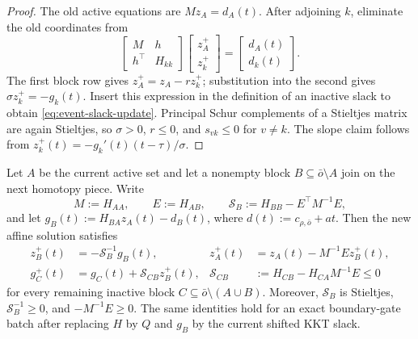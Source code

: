 \begin{proof}
The old active equations are $Mz_A=d_A(t)$.  After adjoining $k$, eliminate
the old coordinates from
\begin{equation*}
 \begin{bmatrix}M&h\\h^\top&H_{kk}\end{bmatrix}
 \begin{bmatrix}z_A^+\\z_k^+\end{bmatrix}
 =\begin{bmatrix}d_A(t)\\d_k(t)\end{bmatrix}.
\end{equation*}
The first block row gives $z_A^+=z_A-rz_k^+$; substitution into the second
gives $\sigma z_k^+=-g_k(t)$.  Insert this expression in the definition of
an inactive slack to obtain \cref{eq:event-slack-update}.  Principal Schur
complements of a Stieltjes matrix are again Stieltjes, so
$\sigma>0$, $r\leq0$, and $s_{vk}\leq0$ for $v\ne k$.  The slope claim
follows from $z_k^+(t)=-g_k'(t)(t-\tau)/\sigma$.
\end{proof}

\begin{lemma}
\label{lem:block-event-schur-update}
Let $A$ be the current active set and let a nonempty block
$B\subseteq\bar o\setminus A$ join on the next homotopy piece.  Write
\begin{equation}
 M:=H_{AA},
 \qquad E:=H_{AB},
 \qquad
 \mathcal S_B:=H_{BB}-E^\top M^{-1}E,
 \label{eq:block-event-schur-data}
\end{equation}
and let
$g_B(t):=H_{BA}z_A(t)-d_B(t)$, where
$d(t):=c_{\rho,\bar o}+at$.  Then the new affine solution satisfies
\begin{align}
 z_B^+(t)&=-\mathcal S_B^{-1}g_B(t),
 &z_A^+(t)&=z_A(t)-M^{-1}Ez_B^+(t),
 \label{eq:block-event-primal-update}\\
 g_C^+(t)&=g_C(t)+\mathcal S_{CB}z_B^+(t),
 &\mathcal S_{CB}&:=H_{CB}-H_{CA}M^{-1}E\leq0
 \label{eq:block-event-slack-update}
\end{align}
for every remaining inactive block
$C\subseteq\bar o\setminus(A\cup B)$.  Moreover,
$\mathcal S_B$ is Stieltjes, $\mathcal S_B^{-1}\geq0$, and
$-M^{-1}E\geq0$.  The same identities hold for an exact boundary-gate batch
after replacing $H$ by $Q$ and $g_B$ by the current shifted KKT slack.
\end{lemma}

